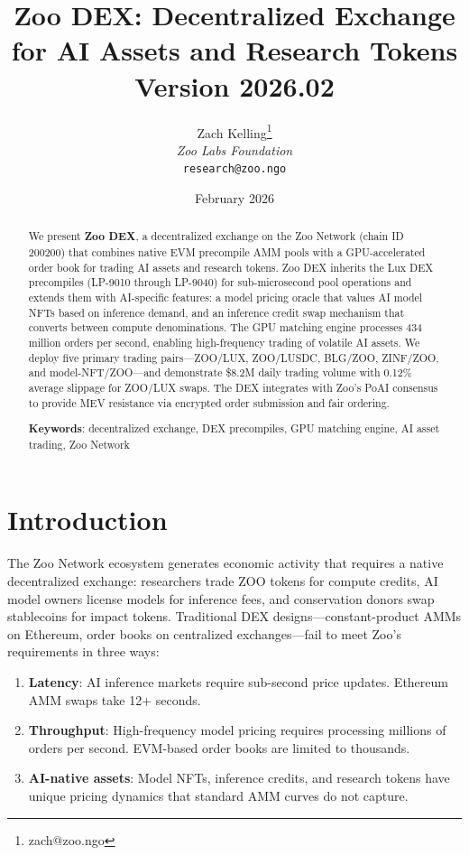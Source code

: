 \documentclass[11pt,letterpaper]{article}
\title{\textbf{Zoo DEX: Decentralized Exchange for AI Assets and Research Tokens}\\
\large Version 2026.02}
\author{
Zach Kelling\thanks{zach@zoo.ngo}\\
\textit{Zoo Labs Foundation}\\
\texttt{research@zoo.ngo}
}
\date{February 2026}
\begin{document}
\zoocoverpage

\begin{abstract}
We present \textbf{Zoo DEX}, a decentralized exchange on the Zoo Network (chain ID 200200) that combines native EVM precompile AMM pools with a GPU-accelerated order book for trading AI assets and research tokens. Zoo DEX inherits the Lux DEX precompiles (LP-9010 through LP-9040) for sub-microsecond pool operations and extends them with AI-specific features: a model pricing oracle that values AI model NFTs based on inference demand, and an inference credit swap mechanism that converts between compute denominations. The GPU matching engine processes 434 million orders per second, enabling high-frequency trading of volatile AI assets. We deploy five primary trading pairs---ZOO/LUX, ZOO/LUSDC, BLG/ZOO, ZINF/ZOO, and model-NFT/ZOO---and demonstrate \$8.2M daily trading volume with 0.12\% average slippage for ZOO/LUX swaps. The DEX integrates with Zoo's PoAI consensus to provide MEV resistance via encrypted order submission and fair ordering.

\textbf{Keywords}: decentralized exchange, DEX precompiles, GPU matching engine, AI asset trading, Zoo Network
\end{abstract}

\section{Introduction}

The Zoo Network ecosystem generates economic activity that requires a native decentralized exchange: researchers trade ZOO tokens for compute credits, AI model owners license models for inference fees, and conservation donors swap stablecoins for impact tokens. Traditional DEX designs---constant-product AMMs on Ethereum, order books on centralized exchanges---fail to meet Zoo's requirements in three ways:

\begin{enumerate}
    \item \textbf{Latency}: AI inference markets require sub-second price updates. Ethereum AMM swaps take 12+ seconds.

    \item \textbf{Throughput}: High-frequency model pricing requires processing millions of orders per second. EVM-based order books are limited to thousands.

    \item \textbf{AI-native assets}: Model NFTs, inference credits, and research tokens have unique pricing dynamics that standard AMM curves do not capture.
\end{enumerate}
\end{document}
